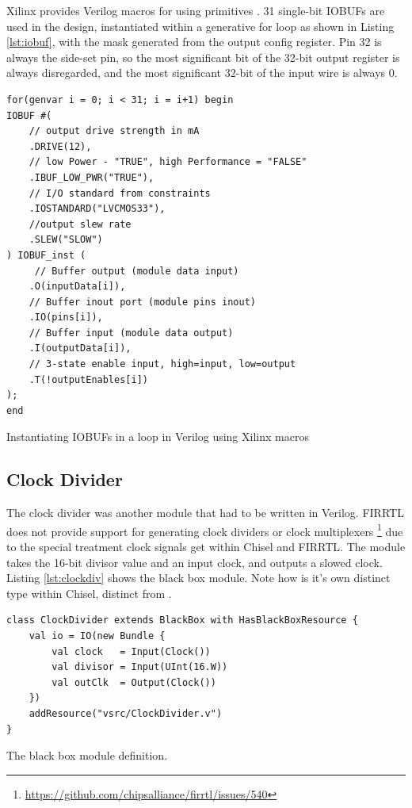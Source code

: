 Xilinx provides Verilog macros for using primitives \cite{vivado_libs}. 31 single-bit IOBUFs are used in the design, instantiated within a generative for loop as shown in Listing \ref{lst:iobuf}, with the  mask generated from the output config register. Pin 32 is always the side-set pin, so the most significant bit of the 32-bit output register is always disregarded, and the most significant 32-bit of the input wire is always 0.

\begin{listing}[h!]
    \vspace{0.5cm}
    \begin{verbatim}
for(genvar i = 0; i < 31; i = i+1) begin
IOBUF #( 
    // output drive strength in mA
    .DRIVE(12), 
    // low Power - "TRUE", high Performance = "FALSE"
    .IBUF_LOW_PWR("TRUE"),  
    // I/O standard from constraints
    .IOSTANDARD("LVCMOS33"),
    //output slew rate 
    .SLEW("SLOW") 
) IOBUF_inst (
     // Buffer output (module data input)
    .O(inputData[i]),
    // Buffer inout port (module pins inout)     
    .IO(pins[i]),   
    // Buffer input (module data output)
    .I(outputData[i]),     
    // 3-state enable input, high=input, low=output
    .T(!outputEnables[i])     
);
end
    \end{verbatim}
    \caption{Instantiating IOBUFs in a loop in Verilog using Xilinx macros\cite{vivado_libs}}
    \label{lst:iobuf}
\end{listing}

\subsection{Clock Divider}

The clock divider was another module that had to be written in Verilog. FIRRTL does not provide support for generating clock dividers or clock multiplexers \footnote{\url{https://github.com/chipsalliance/firrtl/issues/540}} due to the special treatment clock signals get within Chisel and FIRRTL. The module takes the 16-bit divisor value and an input clock, and outputs a slowed clock. Listing \ref{lst:clockdiv} shows the black box module. Note how  is it's own distinct type within Chisel, distinct from .

\begin{listing}[h!]
    \centering
    \vspace{0.5cm}
    \begin{verbatim}
class ClockDivider extends BlackBox with HasBlackBoxResource {
    val io = IO(new Bundle {
        val clock   = Input(Clock())
        val divisor = Input(UInt(16.W))
        val outClk  = Output(Clock())
    })
    addResource("vsrc/ClockDivider.v")
}
    \end{verbatim}
    \caption{The  black box module definition.}
    \label{lst:clockdiv}
\end{listing}

